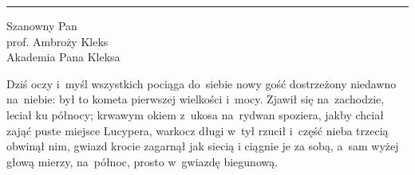 \documentclass{article}
\begin{document}
 
\thispagestyle{firstpage}

\rule{0cm}{1.5cm}


\rule{0cm}{1.5cm}
 
\rule{0.45\textwidth}{0cm}
\begin{minipage}{0.5\textwidth}
\large
Szanowny Pan\\
prof. Ambroży Kleks\\
Akademia Pana Kleksa
\end{minipage} 

\vfill 

% 


Dziś oczy i~myśl wszystkich pociąga do~siebie
nowy gość dostrzeżony niedawno na~niebie:
był to kometa pierwszej wielkości i~mocy.
Zjawił się na~zachodzie, leciał ku północy;
krwawym okiem z~ukosa na~ryd\-wan spoziera,
jakby chciał zająć puste miejsce Lucypera,
warkocz długi w~tył rzucił i~część nieba trzecią
obwinął nim, gwiazd krocie zagarnął jak siecią
i ciągnie je za sobą, a~sam wyżej głową
mierzy, na~północ, prosto w~gwiazdę biegunową.

\vfill 
\vfill
\end{document}
